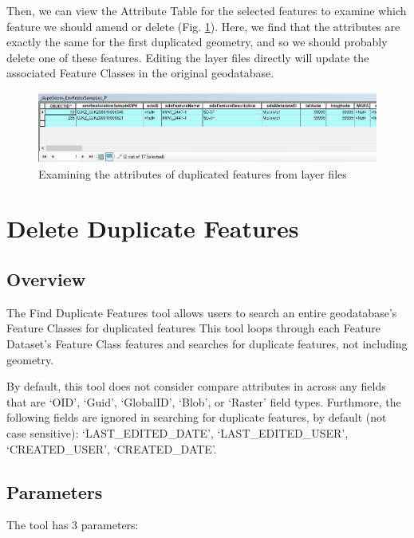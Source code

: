 \documentclass[openany]{book}
\theoremstyle{definition}
\theoremstyle{definition}
\theoremstyle{definition}
\theoremstyle{remark}
\begin{document}
Then, we can view the Attribute Table for the selected features to
examine which feature we should amend or delete (Fig.
\ref{fig:layAtts}). Here, we find that the attributes are exactly the
same for the first duplicated geometry, and so we should probably delete
one of these features. Editing the layer files directly will update the
associated Feature Classes in the original geodatabase.

\begin{figure}[H]

{\centering \includegraphics{figures/dupG-layAtts} 

}

\caption{Examining the attributes of duplicated features from layer files}\label{fig:layAtts}
\end{figure}

\chapter{Delete Duplicate Features}\label{delFeats}

\section{Overview}\label{overview-4}

The Find Duplicate Features tool allows users to search an entire
geodatabase's Feature Classes for duplicated features This tool loops
through each Feature Dataset's Feature Class features and searches for
duplicate features, not including geometry.

By default, this tool does not consider compare attributes in across any
fields that are `OID', `Guid', `GlobalID', `Blob', or `Raster' field
types. Furthmore, the following fields are ignored in searching for
duplicate features, by default (not case sensitive):
`LAST\_EDITED\_DATE', `LAST\_EDITED\_USER', `CREATED\_USER',
`CREATED\_DATE'.

\section{Parameters}\label{parameters-4}

The tool has 3 parameters:
\end{document}
